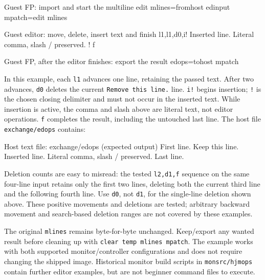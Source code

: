 \begin{commandexample}{Guest FP: import and start the multiline edit}
mlines=fromhost edinput
mpatch=edit mlines
\end{commandexample}

\begin{commandexample}{Guest editor: move, delete, insert text and finish}
l1,l1,d0,i!
Inserted line.
Literal comma, slash / preserved.
!
f
\end{commandexample}

\begin{commandexample}{Guest FP, after the editor finishes: export the result}
edops=tohost mpatch
\end{commandexample}

In this example, each \passthrough{\lstinline!l1!} advances one line, retaining the passed text. After two advances, \passthrough{\lstinline!d0!} deletes the current \passthrough{\lstinline!Remove this line.!} line. \passthrough{\lstinline"i!"} begins insertion; \passthrough{\lstinline"!"} is the chosen closing delimiter and must not occur in the inserted text. While insertion is active, the comma and slash above are literal text, not editor operations. \passthrough{\lstinline!f!} completes the result, including the untouched last line. The host file \passthrough{\lstinline!exchange/edops!} contains:

\begin{commandexample}{Host text file: exchange/edops (expected output)}
First line.
Keep this line.
Inserted line.
Literal comma, slash / preserved.
Last line.
\end{commandexample}

Deletion counts are easy to misread: the tested \passthrough{\lstinline!l2,d1,f!} sequence on the same four-line input retains only the first two lines, deleting both the current third line and the following fourth line. Use \passthrough{\lstinline!d0!}, not \passthrough{\lstinline!d1!}, for the single-line deletion shown above. These positive movements and deletions are tested; arbitrary backward movement and search-based deletion ranges are not covered by these examples.

The original \passthrough{\lstinline!mlines!} remains byte-for-byte unchanged. Keep/export any wanted result before cleaning up with \passthrough{\lstinline!clear temp mlines mpatch!}. The example works with both supported monitor/controller configurations and does not require changing the shipped image. Historical monitor build scripts in \passthrough{\lstinline!monsrc/hjmops!} contain further editor examples, but are not beginner command files to execute.

